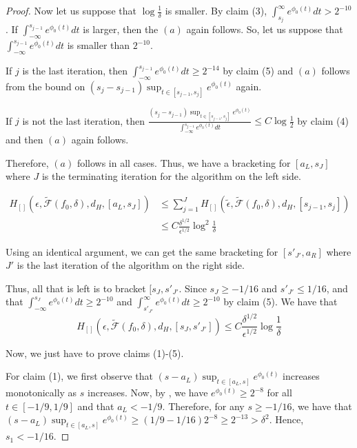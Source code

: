 \documentclass[12pt]{article}
\begin{document}
\begin{proof}
  Now let us suppose that $\log \frac{1}{\delta}$ is smaller. By claim (3), $\int_{s_j}^\infty e^{\phi_0(t)} dt > 2^{-10}$. If $\int_{-\infty}^{s_{j-1}} e^{\phi_0(t)}dt$ is larger, then the $(a)$ again follows. So, let us suppose that $\int_{-\infty}^{s_{j-1}} e^{\phi_0(t)} dt$ is smaller than $2^{-10}$.

  If $j$ is the last iteration, then $\int_{-\infty}^{s_{j-1}} e^{\phi_0(t)} dt \geq 2^{-14}$ by claim (5) and $(a)$ follows from the bound on $(s_j - s_{j-1})  \sup_{t \in [s_{j-1}, s_j]} e^{\phi_0(t)}$ again. 

  
  If $j$ is not the last iteration, then $\frac{(s_j - s_{j-1}) \sup_{t \in [s_{j-1}, s_j]} e^{\phi_0(t)} }{\int_{-\infty}^{s_{j-1}} e^{\phi_0(t)}dt } \leq C \log \frac{1}{2}$ by claim (4) and then $(a)$ again follows.

  Therefore, $(a)$ follows in all cases. Thus, we have a bracketing for $[a_L, s_J]$ where $J$ is the terminating iteration for the algorithm on the left side.

  \begin{align*}
    H_{[]}(\epsilon, \tilde{\mathcal{F}}(f_0, \delta), d_H, [a_L, s_J]) &\leq
    \sum_{j=1}^J H_{[]}(\tilde{\epsilon}, \tilde{\mathcal{F}}(f_0, \delta), d_H, [s_{j-1}, s_j]) \\
                                                                &\leq C \frac{\delta^{1/2}}{\epsilon^{1/2}} \log^2 \frac{1}{\delta}
  \end{align*}
   

  Using an identical argument, we can get the same bracketing for $[s'_{J'}, a_R]$ where $J'$ is the last iteration of the algorithm on the right side.

  Thus, all that is left is to bracket $[s_J, s'_{J'}$. Since $s_J \geq -1/16$ and $s'_{J'} \leq 1/16$, and that $\int_{-\infty}^{s_J} e^{\phi_0(t)}dt \geq 2^{-10}$ and $\int_{s'_{J'}}^\infty e^{\phi_0(t)} dt \geq 2^{-10}$ by claim (5). We have that
  \[
    H_{[]}(\epsilon, \tilde{\mathcal{F}}(f_0, \delta), d_H, [s_J, s'_{J'}]) \leq
    C \frac{\delta^{1/2} }{\epsilon^{1/2}} \log \frac{1}{\delta}
  \]


  Now, we just have to prove claims (1)-(5).

  For claim (1), we first observe that $(s - a_L)  \sup_{t \in [a_L, s]} e^{\phi_0(t)}$ increases monotonically as $s$ increases. Now, by \cite{lovasz2007geometry}, we have $e^{\phi_0(t)} \geq 2^{-8}$ for all $t \in [-1/9, 1/9]$ and that $a_L < -1/9$. Therefore, for any $s \geq -1/16$, we have that $(s - a_L) \sup_{t \in [a_L, s]} e^{\phi_0(t)} \geq (1/9 - 1/16) 2^{-8} \geq 2^{-13} > \delta^2$. Hence, $s_1 < -1/16$.


\end{proof}
\end{document}
